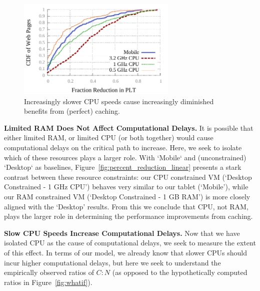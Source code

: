 \begin{figure}[t]
    \includegraphics[width=3in]{../graphs/percent_plt_reduction/percent_reduction_linear_CPU_comparison.pdf}
    \caption[]{\label{fig:plt_cpu_comparison}Increasingly slower CPU speeds cause increasingly diminished benefits from (perfect) caching.}
\end{figure}
{\bf Limited RAM Does Not Affect Computational Delays.}
It is possible that either limited RAM, or limited CPU (or both together) would cause computational delays on the critical path to increase.
Here, we seek to isolate which of these resources plays a larger role.
With `Mobile` and (unconstrained) `Desktop` as baselines, Figure~\ref{fig:percent_reduction_linear} presents a stark contrast between these resource constraints:
our CPU constrained VM (`Desktop Constrained - 1 GHz CPU') behaves very similar to our tablet (`Mobile'), while our RAM constrained VM (`Desktop Constrained - 1 GB RAM') is more closely aligned with the `Desktop' results.
From this we conclude that CPU, not RAM, plays the larger role in determining the performance improvements from caching.


{\bf Slow CPU Speeds Increase Computational Delays.}
Now that we have isolated CPU as the cause of computational delays, we seek to measure the extent of this effect. In terms of our model, we already know that slower CPUs should incur higher computational delays, but here we seek to understand the empirically observed ratios of $C:N$ (as opposed to the hypothetically computed ratios in Figure~\ref{fig:whatif}). 


